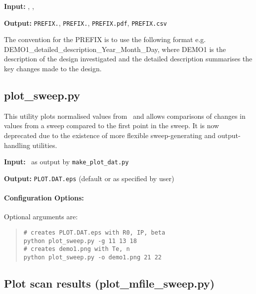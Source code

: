 \begin{description}
\item{\textbf{Input:}}
\indat, \outdat, \mfile

\item{\textbf{Output:}}
\verb|PREFIX.|\indat, \verb|PREFIX.|\outdat, \verb|PREFIX.pdf|, \verb|PREFIX.csv|
\end{description}

The convention for the PREFIX is to use the following format e.g. DEMO1\_detailed\_description\_Year\_Month\_Day, where DEMO1 is the description of the design investigated and the detailed description summarises the key changes made to the design.


\subsection{plot\_sweep.py}

This utility plots normalised values from \plotdat\ and allows comparisons of
changes in values from a sweep compared to the first point in the sweep. It is
now deprecated due to the existence of more flexible sweep-generating
and output-handling utilities. 

\begin{description}
\item{\textbf{Input:}}
 \plotdat\, as output by \texttt{make\_plot\_dat.py}

\item{\textbf{Output:}}
\texttt{PLOT.DAT.eps} (default or as specified by user)
\end{description}

\paragraph{Configuration Options:}

Optional arguments are:
\begin{quote}
\begin{verbatim}
# creates PLOT.DAT.eps with R0, IP, beta
python plot_sweep.py -g 11 13 18
# creates demo1.png with Te, n
python plot_sweep.py -o demo1.png 21 22
\end{verbatim}
\end{quote}

\subsection{Plot scan results (plot\_mfile\_sweep.py)}

